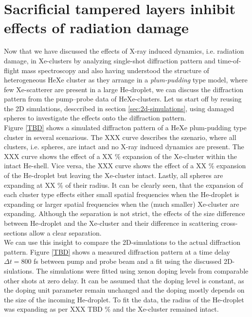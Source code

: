 \section{Sacrificial tampered layers inhibit effects of radiation damage}\label{sec:helium-xenon-data}
Now that we have discussed the effects of X-ray induced dynamics, i.e. radiation damage, in Xe-clusters by analyzing single-shot diffraction pattern and time-of-flight mass spectroscopy and also having understood the structure of heterogeneous HeXe cluster as they arrange in a \textit{plum-pudding} type model, where few Xe-scatterer are present in a large He-droplet, we can discuss the diffraction pattern from the pump--probe data of HeXe-clusters. Let us start off by reusing the 2D simulations, desccribed in section \ref{sec:2d-simulations}, using damaged spheres to investigate the effects onto the diffraction pattern.\\
Figure \ref{TBD} shows a simulated diffracton pattern of a HeXe plum-pudding type cluster in several scenarious. The XXX curve describes the szenario, where all clusters, i.e. spheres, are intact and no X-ray induced dynamics are present. The XXX curve shows the effect of a XX \% expansion of the Xe-cluster within the intact He-shell. Vice versa, the XXX curve shows the effect of a XX \% expansion of the He-droplet but leaving the Xe-cluster intact. Lastly, all spheres are expanding at XX \% of their radius. It can be clearly seen, that the expansion of each cluster type effects either small spatial frequencies when the He-droplet is expanding or larger spatial frequencies when the (much smaller) Xe-cluster are expanding. Although the separation is not strict, the effects of the size difference between He-droplet and the Xe-cluster and their difference in scattering cross-sections allow a clear separation.\\
We can use this insight to compare the 2D-simulations to the actual diffraction pattern. Figure \ref{TBD} shows a measured diffraction pattern at a time delay $\Delta t=800$ fs between pump and probe beam and a fit using the discussed 2D-siulations. The simulations were fitted using xenon doping levels from comparable other shots at zero delay. It can be assumed that the doping level is constant, as the doping unit parameter remain unchanged and the doping mostly depends on the size of the incoming He-droplet. To fit the data, the radius of the He-droplet was expanding as per XXX TBD \% and the Xe-cluster remained intact.\\

